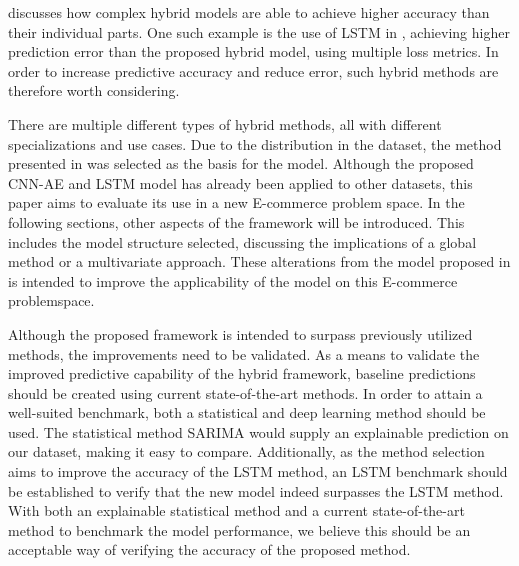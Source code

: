 discusses how complex hybrid models are able to achieve higher accuracy than their individual parts.
One such example is the use of LSTM in \cite{Zhao2019}, achieving higher prediction error than the proposed hybrid model, using multiple loss metrics.
In order to increase predictive accuracy and reduce error, such hybrid methods are therefore worth considering.


There are multiple different types of hybrid methods, all with different specializations and use cases.
Due to the distribution in the dataset, the method presented in \cite{Zhao2019} was selected as the basis for the model.
Although the proposed CNN-AE and LSTM model has already been applied to other datasets, this paper aims to evaluate its use in a new E-commerce problem space.
In the following sections, other aspects of the framework will be introduced.
This includes the model structure selected, discussing the implications of a global method or a multivariate approach.
These alterations from the model proposed in \cite{Zhao2019} is intended to improve the applicability of the model on this E-commerce problemspace.


Although the proposed framework is intended to surpass previously utilized methods,
the improvements need to be validated.
As a means to validate the improved predictive capability of the hybrid framework,
baseline predictions should be created using current state-of-the-art methods.
In order to attain a well-suited benchmark, both a statistical and deep learning method should be used.
The statistical method SARIMA would supply an explainable prediction on our dataset, making it easy to compare.
Additionally, as the method selection aims to improve the accuracy of the LSTM method,
an LSTM benchmark should be established to verify that the new model indeed surpasses the LSTM method.
With both an explainable statistical method and a current state-of-the-art method to benchmark the model performance,
we believe this should be an acceptable way of verifying the accuracy of the proposed method.

